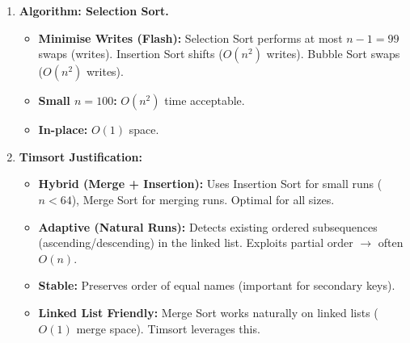 \documentclass[11pt]{article}
\begin{document}
\begin{exoresolu}
\begin{enumerate}
\begin{itemize}
            \end{itemize}
        \item \textbf{Algorithm: Selection Sort.}
            \begin{itemize}
                \item \textbf{Minimise Writes (Flash):} Selection Sort performs at most $n-1 = 99$ swaps (writes). Insertion Sort shifts ($O(n^2)$ writes). Bubble Sort swaps ($O(n^2)$ writes).
                \item \textbf{Small $n=100$:} $O(n^2)$ time acceptable.
                \item \textbf{In-place:} $O(1)$ space.
            \end{itemize}
        \item \textbf{Timsort Justification:}
            \begin{itemize}
                \item \textbf{Hybrid (Merge + Insertion):} Uses Insertion Sort for small runs ($n < 64$), Merge Sort for merging runs. Optimal for all sizes.
                \item \textbf{Adaptive (Natural Runs):} Detects existing ordered subsequences (ascending/descending) in the linked list. Exploits partial order $\rightarrow$ often $O(n)$.
                \item \textbf{Stable:} Preserves order of equal names (important for secondary keys).
                \item \textbf{Linked List Friendly:} Merge Sort works naturally on linked lists ($O(1)$ merge space). Timsort leverages this.
            \end{itemize}
    \end{enumerate}
\end{exoresolu}
\end{document}
